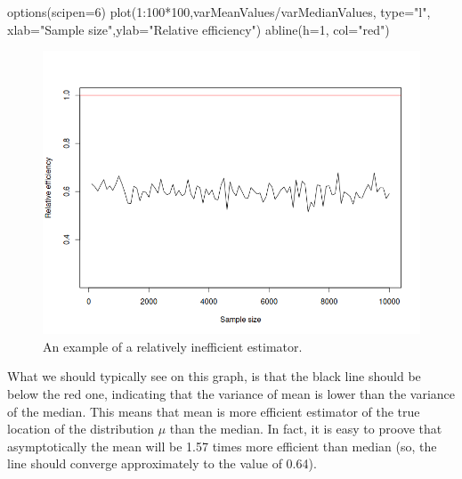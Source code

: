 \documentclass[
]{book}
\newenvironment{Shaded}{\begin{snugshade}}{\end{snugshade}}
\newcommand{\AttributeTok}[1]{\textcolor[rgb]{0.77,0.63,0.00}{#1}}
\newcommand{\DecValTok}[1]{\textcolor[rgb]{0.00,0.00,0.81}{#1}}
\newcommand{\FunctionTok}[1]{\textcolor[rgb]{0.00,0.00,0.00}{#1}}
\newcommand{\NormalTok}[1]{#1}
\newcommand{\SpecialCharTok}[1]{\textcolor[rgb]{0.00,0.00,0.00}{#1}}
\newcommand{\StringTok}[1]{\textcolor[rgb]{0.31,0.60,0.02}{#1}}
\theoremstyle{definition}
\theoremstyle{definition}
\theoremstyle{definition}
\theoremstyle{definition}
\theoremstyle{remark}
\begin{document}
\begin{Shaded}
\begin{Highlighting}[]
\FunctionTok{options}\NormalTok{(}\AttributeTok{scipen=}\DecValTok{6}\NormalTok{)}
\FunctionTok{plot}\NormalTok{(}\DecValTok{1}\SpecialCharTok{:}\DecValTok{100}\SpecialCharTok{*}\DecValTok{100}\NormalTok{,varMeanValues}\SpecialCharTok{/}\NormalTok{varMedianValues, }\AttributeTok{type=}\StringTok{"l"}\NormalTok{, }\AttributeTok{xlab=}\StringTok{"Sample size"}\NormalTok{,}\AttributeTok{ylab=}\StringTok{"Relative efficiency"}\NormalTok{)}
\FunctionTok{abline}\NormalTok{(}\AttributeTok{h=}\DecValTok{1}\NormalTok{, }\AttributeTok{col=}\StringTok{"red"}\NormalTok{)}
\end{Highlighting}
\end{Shaded}

\begin{figure}
\centering
\includegraphics{images/02-statistics-efficiency.png}
\caption{\label{fig:statsEfficiecny}An example of a relatively inefficient estimator.}
\end{figure}

What we should typically see on this graph, is that the black line should be below the red one, indicating that the variance of mean is lower than the variance of the median. This means that mean is more efficient estimator of the true location of the distribution \(\mu\) than the median. In fact, it is easy to proove that asymptotically the mean will be 1.57 times more efficient than median \citep{WikipediaMedianEfficiency2020} (so, the line should converge approximately to the value of 0.64).
\end{document}
